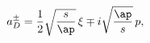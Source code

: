 \begin{equation*}
a_D^{\pm}=\frac{1}{2}\sqrt{\frac{s}{\ap}}\,\xi\mp i\sqrt{\frac{\ap}{s}}\,p,
\end{equation*}

